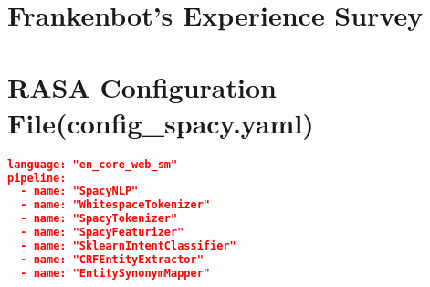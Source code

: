 
\begin{appendix}
\renewcommand\thesection{\Alph{section}}

\section{Frankenbot's Experience Survey\label{appen:survey}}


\section{RASA Configuration File(config\_spacy.yaml)\label{appen:rasaConf}}
\begin{lstlisting}[language=json, firstnumber=1]
language: "en_core_web_sm"
pipeline:
  - name: "SpacyNLP"
  - name: "WhitespaceTokenizer"
  - name: "SpacyTokenizer"
  - name: "SpacyFeaturizer"
  - name: "SklearnIntentClassifier"
  - name: "CRFEntityExtractor"
  - name: "EntitySynonymMapper"
\end{lstlisting}


\end{appendix}
